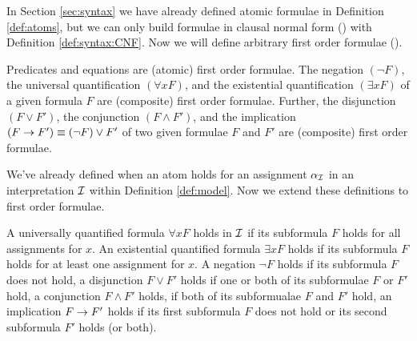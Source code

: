 

In Section \ref{sec:syntax} we have already defined atomic formulae in Definition \ref{def:atoms}, 
but we can only build formulae in clausal normal form (\CNF) with Definition \vref{def:syntax:CNF}.
Now we will define arbitrary first order formulae (\FOF).

\begin{definition}[\FOF]\label{def:syntax:FOF}
	Predicates and equations are (atomic) first order formulae. 
	The negation $(\lnot F)$, 
	the universal quantification $(\forall x F)$, 
	and the existential quantification $(\exists x F)$ 
	of a given formula $F$ are (composite) first order formulae.
	Further, the disjunction $(F \lor F')$, 
	the conjunction $(F \land F') $, 
	and the implication $(F \rightarrow F') \equiv (\lnot F) \lor F'$ 
	of two given formulae $F$ and $F'$ 
	are (composite) first order formulae.
\end{definition}

We've already defined when an atom holds for an assignment $\alpha_{\mathcal I}$ 
in an interpretation ${\mathcal I}$ within Definition \vref{def:model}.
Now we extend these definitions to first order formulae.

\begin{definition}\label{def:semantics:FOF}
	
	A universally quantified formula $\forall x F$ holds in ${\mathcal I}$ if its subformula $F$ holds for all assignments for $x$.
	An existential quantified formula $\exists xF$ holds if its subformula $F$ holds for at least one assignment for $x$.
	A negation $\lnot F$ holds if its subformula $F$ does not hold, 
	a disjunction $F\lor F'$ holds if one or both of its subformulae $F$ or $F'$ hold,
	a conjunction $F\land F'$ holds, if both of its subformualae $F$ and $F'$ hold, 
	an implication $F\rightarrow F'$ holds if its first subformula $F$ does not hold or its second subformula $F'$ holds (or both).
\end{definition}


